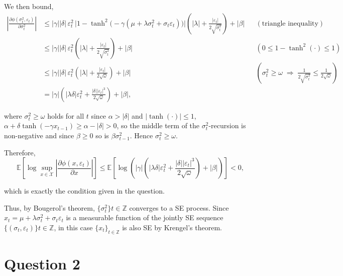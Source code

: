 \documentclass[a4paper, 12pt]{article}
\theoremstyle{definition}
\begin{document}
\par We then bound,
\begin{align*}
\left|\frac{\partial\phi(\sigma_t^2,\varepsilon_t)}{\partial\sigma_t^2}\right|
&\le |\gamma||\delta|\,\varepsilon_t^2\,\Big|1-\tanh^2\big(-\gamma(\mu+\lambda\sigma_t^2+\sigma_t\varepsilon_t)\big)\Big|\left(|\lambda|+\frac{|\varepsilon_t|}{2\sqrt{\sigma_t^2}}\right)+|\beta| &&(\text{triangle inequality}) \\[4pt]
&\le |\gamma||\delta|\,\varepsilon_t^2\left(|\lambda|+\frac{|\varepsilon_t|}{2\sqrt{\sigma_t^2}}\right)+|\beta| &&(0\le1-\tanh^2(\cdot)\le1) \\[4pt]
&\le |\gamma||\delta|\,\varepsilon_t^2\left(|\lambda|+\frac{|\varepsilon_t|}{2\sqrt{\omega}}\right)+|\beta| &&(\sigma_t^2\ge\omega \;\Rightarrow\; \tfrac{1}{2\sqrt{\sigma_t^2}}\le\tfrac{1}{2\sqrt{\omega}}) \\[4pt]
&= |\gamma|\left(|\lambda\delta|\varepsilon_t^2+\frac{|\delta||\varepsilon_t|^3}{2\sqrt{\omega}}\right)+|\beta|,
\end{align*}
\par where $\sigma_t^2\ge\omega$ holds for all $t$ since $\alpha>|\delta|$ and $|\tanh(\cdot)|\le1$, $\alpha+\delta\tanh(-\gamma x_{t-1})\ge\alpha-|\delta|>0$, so the middle term of the $\sigma_t^2$-recursion is non-negative and since $\beta\ge0$ so is $\beta\sigma_{t-1}^2$. Hence $\sigma_t^2\ge\omega$.
 
\par Therefore,
\[
\mathbb{E}\left[\log\sup_{x\in\mathcal{X}}\left|\frac{\partial\phi(x,\varepsilon_t)}{\partial x}\right|\right]\le\mathbb{E}\left[\log\left(|\gamma|\left(|\lambda\delta|\varepsilon_t^2+\frac{|\delta||\varepsilon_t|^3}{2\sqrt{\omega}}\right)+|\beta|\right)\right] < 0,
\]
\par which is exactly the condition given in the question.


\noindent Thus, by Bougerol's theorem, $\{\sigma_t^2\}{t\in\mathbb{Z}}$ converges to a SE process. Since $x_t=\mu+\lambda\sigma_t^2+\sigma_t\varepsilon_t$ is a measurable function of the jointly SE sequence $\{(\sigma_t,\varepsilon_t)\}{t\in\mathbb{Z}}$, in this case $\{x_t\}_{t\in\mathbb{Z}}$ is also SE by Krengel's theorem.









\section*{Question 2}
\end{document}
